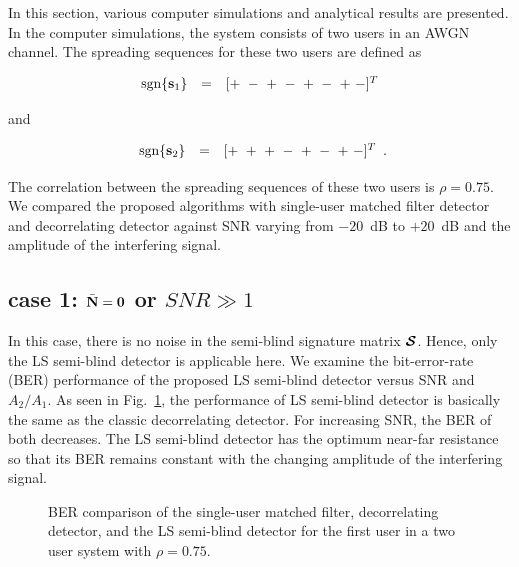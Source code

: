 \documentclass[10pt,fleqn,twocolumn]{IEEEtran}
\newcommand{\bs}{{\bf s}}
\newcommand{\bN}{{\bf N}}
\newcommand{\bcS}{{\mbox {\boldmath ${\cal S}$}}}
\begin{document}
In this section, various computer simulations and analytical
results are presented. In the computer simulations, the system
consists of two users in an AWGN channel. The spreading sequences
for these two users are defined as

\begin{equation}
\begin{array}{rcl}
\mbox{sgn}\{\bs_1\}&=&[+\ -\ +\ -\ +\ -\ +\ -]^T
\end{array}
\end{equation}

\noindent and

\begin{equation}
\begin{array}{rcl}
\mbox{sgn}\{\bs_2\}&=&[+\ +\ +\ -\ +\ -\ +\ -]^T
\end{array}.
\end{equation}

\noindent The correlation between the spreading sequences of these
two users is $\rho=0.75$. We compared the proposed algorithms with
single-user matched filter detector and decorrelating detector
against SNR varying from $-20$~dB to $+20$~dB and the amplitude of
the interfering signal.

\subsection*{case 1: $\bar{\bN} = \mathbf{0}$ or $SNR\gg 1$}

In this case, there is no noise in the semi-blind signature matrix $\bcS$.
Hence, only the LS semi-blind detector is applicable here. We examine
the bit-error-rate (BER) performance of the proposed LS semi-blind
detector versus SNR and $A_2/A_1$.  As seen in Fig.~\ref{BER_LS0}, the
performance of LS semi-blind detector is basically the same as the classic
decorrelating detector. For increasing SNR, the BER of both decreases.
The LS semi-blind detector has the optimum near-far resistance so that its
BER remains constant with the changing amplitude of the interfering signal.
\begin{figure}
\caption{BER comparison of the single-user matched filter,
decorrelating detector, and the LS semi-blind detector for the
first user in a two user system with $\rho=0.75$.} \label{BER_LS0}
\end{figure}
\end{document}
